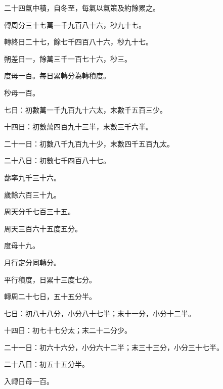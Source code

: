 \begin{pinyinscope}
 二十四氣中積，自冬至，每氣以氣策及約餘累之。



 轉周分三十七萬一千九百八十六，秒九十七。



 轉終日二十七，餘七千四百八十六，秒九十七。



 朔差日一，餘萬三千一百七十六，秒三。



 度母一百。每日累轉分為轉積度。



 秒母一百。



 七日：初數萬一千九百九十六太，末數千五百三少。



 十四日：初數萬四百九十三半，末數三千六半。



 二十一日：初數八千九百九十少，末數四千五百九太。



 二十八日：初數七千四百八十七。



 蔀率九千三十六。



 歲餘六百三十九。



 周天分千七百三十五。



 周天三百六十五度五分。



 度母十九。



 月行定分同轉分。



 平行積度，日累十三度七分。



 轉周二十七日，五十五分半。



 七日：初八十八分，小分八十七半；末十一分，小分十二半。



 十四日：初七十七分太；末二十二分少。



 二十一日：初六十六分，小分六十二半；末三十三分，小分三十七半。



 二十八日：初五十五分半。



 入轉日母一百。




\end{pinyinscope}
